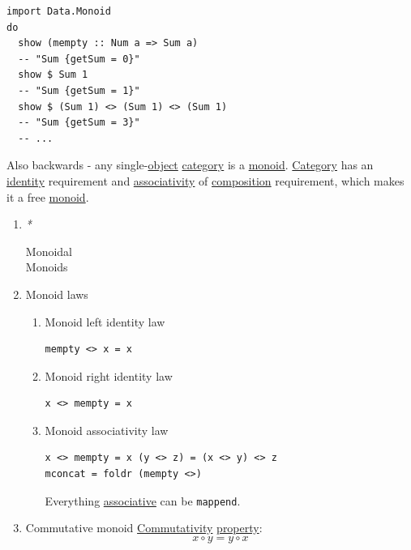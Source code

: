 \documentclass[11pt]{article}
\begin{document}
\begin{verbatim}
import Data.Monoid
do
  show (mempty :: Num a => Sum a)
  -- "Sum {getSum = 0}"
  show $ Sum 1
  -- "Sum {getSum = 1}"
  show $ (Sum 1) <> (Sum 1) <> (Sum 1)
  -- "Sum {getSum = 3}"
  -- ...
\end{verbatim}

Also backwards - any single-\hyperref[org025aac8]{object} \hyperref[org3e3a79b]{category} is a \hyperref[org8ff50ea]{monoid}. \hyperref[org3e3a79b]{Category} has an \hyperref[org3bbbadd]{identity} requirement and \hyperref[org8a2c45d]{associativity} of \hyperref[org24a8abd]{composition} requirement, which makes it a free \hyperref[org8ff50ea]{monoid}.\\

\begin{enumerate}
\item \emph{*}
\label{sec:org08fef3f}

\label{org71af906}Monoidal\\
\label{org7a2517c}Monoids\\

\item \label{org70159d1}Monoid laws
\label{sec:org66ada6b}
\begin{enumerate}
\item \label{org0e34f53}Monoid left identity law
\label{sec:org6a48fd1}
\begin{verbatim}
mempty <> x = x
\end{verbatim}

\item \label{org20bf303}Monoid right identity law
\label{sec:org404c01c}
\begin{verbatim}
x <> mempty = x
\end{verbatim}

\item \label{orgc5b978b}Monoid associativity law
\label{sec:orgca85c80}
\begin{verbatim}
x <> mempty = x (y <> z) = (x <> y) <> z
mconcat = foldr (mempty <>)
\end{verbatim}

Everything \hyperref[org31bffbb]{associative} can be \texttt{mappend}.\\
\end{enumerate}

\item \label{orgd449c14}Commutative monoid
\label{sec:orgbfb823a}
\hyperref[orgcdabb90]{Commutativity} \hyperref[org07ca26b]{property}:\\
$$ x \circ y = y \circ x $$\\


\end{enumerate}
\end{document}
